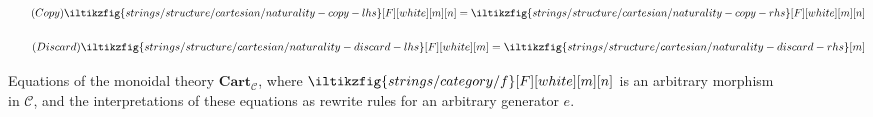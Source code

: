 \begin{figure}
    \centering
    \begin{minipage}{0.45\textwidth}
        \begin{equation}
            \tag{\(\mathsf{Copy}\)}
            \iltikzfig{strings/structure/cartesian/naturality-copy-lhs}[F][white][m][n]
            =
            \iltikzfig{strings/structure/cartesian/naturality-copy-rhs}[F][white][m][n]
            \label{eq:cartesian-copy}
        \end{equation}
        \begin{center}
            
        \end{center}
    \end{minipage}
    \qquad
    \begin{minipage}{0.4\textwidth}
        \centering
        \begin{equation}
            \tag{\(\mathsf{Discard}\)}
            \iltikzfig{strings/structure/cartesian/naturality-discard-lhs}[F][white][m]
            =
            \iltikzfig{strings/structure/cartesian/naturality-discard-rhs}[m]
            \label{eq:cartesian-discard}
        \end{equation}
        \begin{center}
            
        \end{center}
    \end{minipage}
    \caption{
        Equations of the monoidal theory \(\mathbf{Cart}_\mathcal{C}\),
        where \(\iltikzfig{strings/category/f}[F][white][m][n]\) is an arbitrary
        morphism in \(\mathcal{C}\), and the interpretations of these equations
        as rewrite rules for an arbitrary generator \(e\).
    }
    \label{fig:cartesian-equations}
\end{figure}